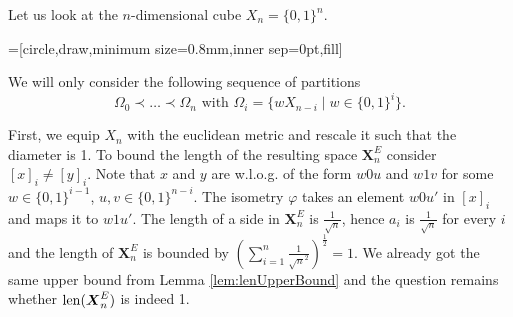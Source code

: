 \begin{example}
	Let us look at the $n$-dimensional cube $X_n=\{0,1\}^n$.
				
	\begin{center}
		=[circle,draw,minimum size=0.8mm,inner sep=0pt,fill]
	\end{center}
	We will only consider the following sequence of partitions
	\[\Omega_0\prec\dots\prec\Omega_n\text{ with }\Omega_i=\{wX_{n-i}\mid w\in\{0,1\}^i\}.\]
				
	First, we equip $X_n$ with the euclidean metric and rescale it such that the diameter is 1. To bound the length of the resulting space $\boldsymbol X^E_n$ consider $[x]_i\neq[y]_i$. Note that $x$ and $y$ are w.l.o.g. of the form $w0u$ and $w1v$ for some $w\in\{0,1\}^{i-1}$, $u,v\in\{0,1\}^{n-i}$. The isometry $\varphi$ takes an element $w0u'$ in $[x]_i$ and maps it to $w1u'$. The length of a side in $\boldsymbol X^E_n$ is $\frac{1}{\sqrt{n}}$, hence $a_i$ is $\frac{1}{\sqrt{n}}$ for every $i$ and the length of $\boldsymbol{X}^E_n$ is bounded by $(\sum_{i=1}^{n}\frac{1}{\sqrt{n}^2})^{\frac{1}{2}}=1$. We already got the same upper bound from Lemma \ref{lem:lenUpperBound} and the question remains whether $\operatorname{len}(\boldsymbol{X}^E_n)$ is indeed 1.
				

\end{example}
